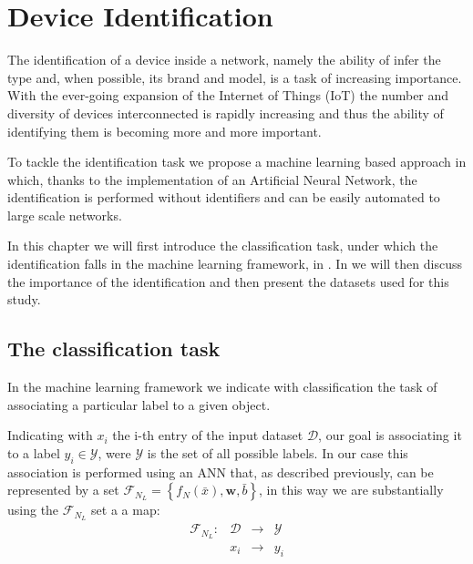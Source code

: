 \chapter{Device Identification}\label{chap3}

The identification of a device inside a network, namely the ability of infer the type
and, when possible, its brand and model, is a task of increasing importance. With the ever-going expansion of the Internet of Things (IoT) the number and diversity of devices interconnected is rapidly increasing and thus the ability of identifying them is becoming more and more important.

To tackle the identification task we propose a machine learning based approach in which, thanks to the implementation of an Artificial Neural Network, the identification is performed without identifiers and can be easily automated to large scale networks. 

In this chapter we will first introduce the classification task, under which the identification falls in the machine learning framework, in . In  we will then discuss the importance of the identification and then present the datasets used for this study.

\section{The classification task}\label{classification}

In the machine learning framework we indicate with classification the task of associating a particular label to a given object. 

Indicating with $x_i$ the i-th entry of the input dataset $\mathcal{D}$, our goal is associating it to a label $y_i\in\mathcal{Y}$, were $\mathcal{Y}$ is the set of all possible labels. In our case this association is performed using an ANN that, as described previously, can be represented by a set $\mathcal{F}_{N_L} = \left\{ f_N(\bar{x}), \boldsymbol{w}, \bar{b}\right\}$, in this way we are substantially using the $\mathcal{F}_{N_L}$ set a a map:
\begin{equation}
    \begin{aligned}
        \mathcal{F}_{N_L}: & \mathcal{D} &\to & \mathcal{Y} \\
        & x_i &\to & y_i \\
    \end{aligned}
\end{equation}

